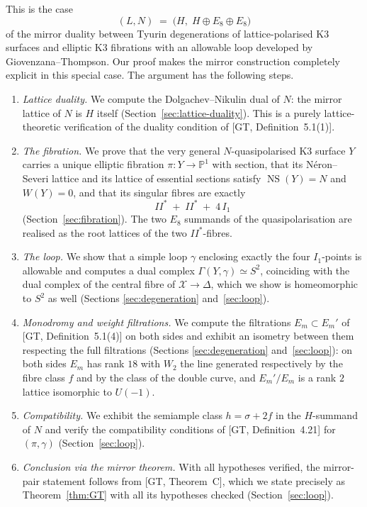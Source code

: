 \documentclass[11pt]{article}
\newcommand{\X}{\mathcal{X}}
\newcommand{\D}{\Delta}
\newcommand{\PP}{\mathbb{P}}
\DeclareMathOperator{\NS}{NS}
\begin{document}
This is the case
\[
(L,N) \;=\; \bigl(H,\;H\oplus E_8\oplus E_8\bigr)
\]
of the mirror duality between Tyurin degenerations of lattice-polarised K3
surfaces and elliptic K3 fibrations with an allowable loop developed by
Giovenzana--Thompson. Our proof makes the mirror construction completely
explicit in this special case. The argument has the following steps.

\begin{enumerate}[label=(\arabic*),leftmargin=2.2em]
\item \emph{Lattice duality.} We compute the Dolgachev--Nikulin dual of $N$:
the mirror lattice of $N$ is $H$ itself
(Section~\ref{sec:lattice-duality}). This is a purely lattice-theoretic
verification of the duality condition of [GT, Definition~5.1(1)].
\item \emph{The fibration.} We prove that the very general
$N$-quasipolarised K3 surface $Y$ carries a unique elliptic fibration
$\pi\colon Y\to\PP^1$ with section, that its N\'eron--Severi lattice and its
lattice of essential sections satisfy $\NS(Y)=N$ and $W(Y)=0$, and that its
singular fibres are exactly
\[
II^* \;+\; II^* \;+\; 4\,I_1
\]
(Section~\ref{sec:fibration}). The two $E_8$ summands of the
quasipolarisation are realised as the root lattices of the two
$II^*$-fibres.
\item \emph{The loop.} We show that a simple loop $\gamma$ enclosing exactly
the four $I_1$-points is allowable and computes a dual complex
$\Gamma(Y,\gamma)\simeq S^2$, coinciding with the dual complex of the
central fibre of $\X\to\D$, which we show is homeomorphic to $S^2$ as well
(Sections \ref{sec:degeneration} and~\ref{sec:loop}).
\item \emph{Monodromy and weight filtrations.} We compute the filtrations
$E_m\subset E_m'$ of [GT, Definition~5.1(4)] on both sides and exhibit an
isometry between them respecting the full filtrations
(Sections \ref{sec:degeneration} and~\ref{sec:loop}): on both sides
$E_m$ has rank $18$ with $W_2$ the line generated respectively by the fibre
class $f$ and by the class of the double curve, and $E_m'/E_m$ is a rank
$2$ lattice isomorphic to $U(-1)$.
\item \emph{Compatibility.} We exhibit the semiample class $h=\sigma+2f$ in
the $H$-summand of $N$ and verify the compatibility conditions of [GT,
Definition~4.21] for $(\pi,\gamma)$ (Section~\ref{sec:loop}).
\item \emph{Conclusion via the mirror theorem.} With all hypotheses
verified, the mirror-pair statement follows from [GT, Theorem~C], which we
state precisely as Theorem~\ref{thm:GT} with all its hypotheses checked
(Section~\ref{sec:loop}).
\end{enumerate}
\end{document}
